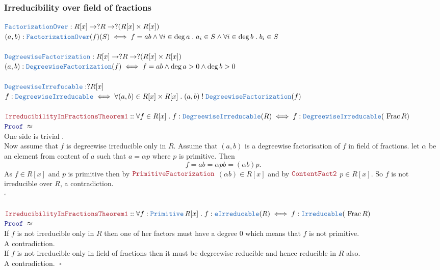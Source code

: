 \documentclass[12pt]{article}
\newcommand{\TYPE}[1]{\textcolor{NavyBlue}{\mathtt{#1}}}
\newcommand{\LOGIC}[1]{\textcolor{Blue}{\mathtt{#1}}}
\newcommand{\THM}[1]{\textcolor{Maroon}{\mathtt{#1}}}
\renewcommand{\.}{\; . \;}
\newcommand{\IsNot}{\; ! \;}
\newcommand{\QED}{\; \square}
\newcommand{\Proof}{\LOGIC{Proof} \; }
\begin{document}
\subsubsection{Irreducibility over field of fractions}
$\TYPE{FactorizationOver} : R[x] \to ?R \to ?(R[x] \times R[x]) $ \\
$(a,b) :\TYPE{FactorizationOver}(f)(S) \iff f = ab \wedge \forall i \in \deg a \. a_i \in S \wedge   \forall i \in \deg b \. b_i \in S  $
\\ \\
$ \TYPE{DegreewiseFactorization} : R[x] \to ?R \to ?(R[x] \times R[x])  $ \\
$(a,b) : \TYPE{DegreewiseFactorization}(f) \iff f = ab \wedge \deg a > 0 \wedge \deg b > 0  $
\\ \\
$ \TYPE{DegreewiseIrrefucable} : ?R[x] $\\
$f : \TYPE{DegreewiseIrreducable} \iff \forall (a,b) \in R[x] \times R[x] \.   (a,b) \IsNot 
\TYPE{DegreewiseFactorization}(f)$
\\ \\
$
\THM{IrreducibilityInFractionsTheorem1} :: \forall f \in R[x] \.   
f : \TYPE{DegreewiseIrreducable}(R) \iff f : \TYPE{DegreewiseIrreducable}( \
\mathrm{Frac} \, R)
$ \\
$ \Proof \approx$ \\
One side is trivial . \\
Now assume that $f$ is degreewise irreducible only in $R$. Assume that $(a,b)$ is a degreewise factorisation of $f$ in  field of fractions. let $\alpha$ be an element from content of $a$ such that $a = \alpha p$ where $p$ is primitive. Then 
$$f = ab = \alpha p b =  (\alpha b) p.$$
As $f \in R[x]$ and $p$ is primitive then by   $\THM{PrimitiveFactorization}$ $(\alpha b) \in R[x]$ and by $\THM{ContentFact2}$ $p \in R[x]$. So $f$ is not irreducible over $R$, a contradiction. \\ $\square$
\\ \\
$
\THM{IrreducibilityInFractionsTheorem1} :: \forall f : \TYPE{Primitive} \, R[x] \.   
f : \TYPE{eIrreducable}(R) \iff f : \TYPE{Irreducable}( \
\mathrm{Frac} \, R)
$ \\
$ \Proof \approx$ \\
If $f$ is not irreducible only in $R$ then one of  her factors must have a degree $0$ which means that $f$ is not primitive. \\
A contradiction. \\
If $f$ is not irreducible only in field of fractions then it must be degreewise reducible and hence reducible in $R$ also. \\
A contradiction. $\QED$ \\
\end{document}
